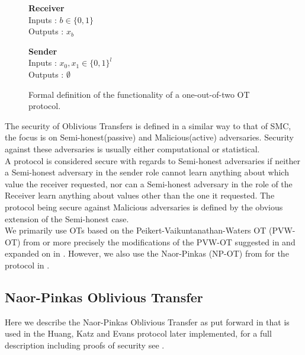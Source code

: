 \documentclass[ %
                    author={Nicholas Tutte},
                supervisor={Prof. Nigel Smart},
                    degree={MEng},
                     title={Secure Two Party Computation},
                  subtitle={A practical comparison of recent protocols},
                      type={Research - GG1K},
                      year={2015} ]{dissertation}
\begin{document}
			\begin{figure}[!htb]
				\centering
				\begin{minipage}{0.45\textwidth}
					\centering
					\textbf{Receiver}\\
					Inputs : $b \in \{0, 1\}$\\
					Outputs : $x_b$\\
				\end{minipage}
				\begin{minipage}{0.45\textwidth}
					\centering
					\textbf{Sender}\\
					Inputs : $x_0, x_1 \in \{0, 1\}^l$\\
					Outputs : $\emptyset$\\
				\end{minipage}

				\caption{ Formal definition of the functionality of a one-out-of-two OT protocol.\label{fig:OTformalDef}}
			\end{figure}

			The security of Oblivious Transfers is defined in a similar way to that of SMC, the focus is on Semi-honest(passive) and Malicious(active) adversaries. Security against these adversaries is usually either computational or statistical.\\

			A protocol is considered secure with regards to Semi-honest adversaries if neither a Semi-honest adversary in the sender role cannot learn anything about which value the receiver requested, nor can a Semi-honest adversary in the role of the Receiver learn anything about values other than the one it requested. The protocol being secure against Malicious adversaries is defined by the obvious extension of the Semi-honest case.\\

			We primarily use OTs based on the Peikert-Vaikuntanathan-Waters OT (PVW-OT) from \cite{PVW_OT_2008} or more precisely the modifications of the PVW-OT suggested in \cite{LindellAndPinkas2011} and expanded on in \cite{Lindell_CnC_2013}. However, we also use the Naor-Pinkas (NP-OT) from \cite{NaorPinkasOT2001} for the protocol in \cite{Katz_Symm_CnC_2013}.


			\subsection{Naor-Pinkas Oblivious Transfer} \label{sub:NaorPinkasOT}

				Here we describe the Naor-Pinkas Oblivious Transfer as put forward in \cite{Katz_Symm_CnC_2013} that is used in the Huang, Katz and Evans protocol later implemented, for a full description including proofs of security see \cite{NaorPinkasOT2001}.\\
\end{document}
